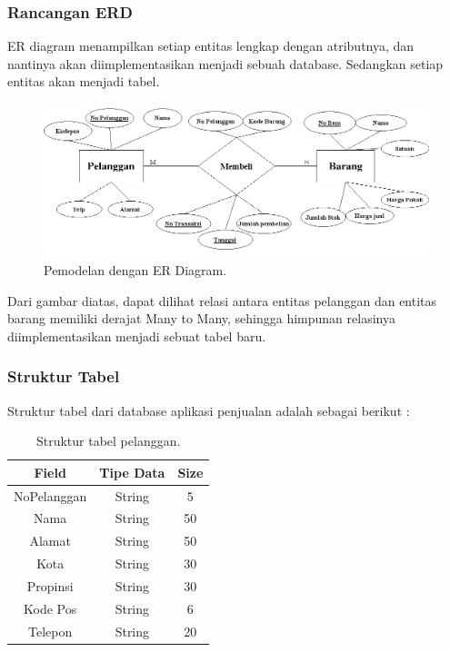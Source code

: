 \documentclass{article}
\begin{document}
\subsubsection{Rancangan ERD}
ER diagram menampilkan setiap entitas lengkap dengan atributnya, dan nantinya akan diimplementasikan menjadi sebuah database. Sedangkan setiap entitas akan menjadi tabel.
\begin{figure}[htp]
    \centering
    \includegraphics[width=12cm]{gambar_3_6.png}
    \caption{ Pemodelan dengan ER Diagram.}
    \label{fig:my_label6}
\end{figure}
\newpage
Dari gambar diatas, dapat dilihat relasi antara entitas pelanggan dan entitas barang memiliki derajat Many to Many, sehingga himpunan relasinya diimplementasikan menjadi sebuat tabel baru.

\subsubsection{Struktur Tabel}
Struktur tabel dari database aplikasi penjualan adalah sebagai berikut :

\begin{table}[h!]
\centering
\begin{tabular}{||c c c ||} 
 \hline
 Field & Tipe Data & Size \\ [0.5ex] 
 \hline\hline
NoPelanggan & String & 5 \\
Nama & String & 50 \\
Alamat & String & 50 \\
Kota & String & 30 \\
Propinsi & String & 30 \\
Kode Pos & String & 6 \\
Telepon & String & 20 \\ [1ex]
 \hline
\end{tabular}
\caption{Struktur tabel pelanggan.}
\label{table:1}
\end{table}
\end{document}
